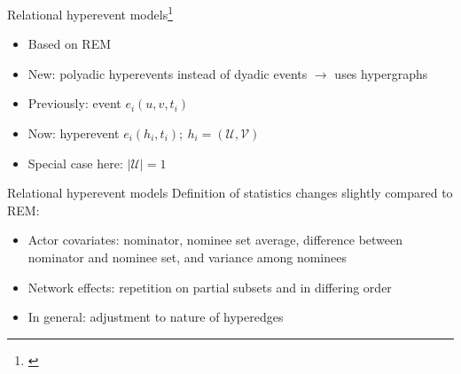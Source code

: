 \documentclass{beamer}
\begin{document}
	\begin{frame}{Relational hyperevent models\footnote{\cite{perry2013point,lerner2019rem,lerner2021relational}}}
		\begin{itemize}
			\item Based on REM
			\item New: polyadic hyperevents instead of dyadic events $\rightarrow$ uses hypergraphs
			\item Previously: event $e_i(u,v,t_i)$
			\item Now: hyperevent $e_i(h_i,t_i);\: h_i = (\mathcal{U},\mathcal{V})$
			\item Special case here: $\lvert \mathcal{U} \rvert = 1$
		\end{itemize}
	\end{frame}

	\begin{frame}{Relational hyperevent models}
		Definition of statistics changes slightly compared to REM:
		\begin{itemize}
			\item Actor covariates: nominator, nominee set average, difference between nominator and nominee set, and variance among nominees
			\item Network effects: repetition on partial subsets and in differing order
			\item In general: adjustment to nature of hyperedges
		\end{itemize}
	\end{frame}
\end{document}
